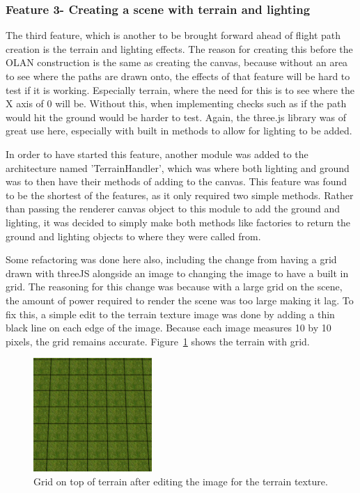 \subsubsection{Feature 3- Creating a scene with terrain and lighting}
The third feature, which is another to be brought forward ahead of flight path creation is the terrain and lighting effects. The reason for creating this before the OLAN construction is the same as creating the canvas, because without an area to see where the paths are drawn onto, the effects of that feature will be hard to test if it is working. Especially terrain, where the need for this is to see where the X axis of 0 will be. Without this, when implementing checks such as if the path would hit the ground would be harder to test. Again, the three.js library was of great use here, especially with built in methods to allow for lighting to be added.

In order to have started this feature, another module was added to the architecture named 'TerrainHandler', which was where both lighting and ground was to then have their methods of adding to the canvas. This feature was found to be the shortest of the features, as it only required two simple methods. Rather than passing the renderer canvas object to this module to add the ground and lighting, it was decided to simply make both methods like factories to return the ground and lighting objects to where they were called from.

Some refactoring was done here also, including the change from having a grid drawn with threeJS alongside an image to changing the image to have a built in grid. The reasoning for this change was because with a large grid on the scene, the amount of power required to render the scene was too large making it lag. To fix this, a simple edit to the terrain texture image was done by adding a thin black line on each edge of the image. Because each image measures 10 by 10 pixels, the grid remains accurate. Figure~\ref{fig:grid} shows the terrain with grid.

\begin{figure}[h]
  \centering
      \includegraphics[width=0.4\textwidth]{images/ground.png}
  \caption{Grid on top of terrain after editing the image for the terrain texture.}
  \label{fig:grid}
\end{figure}

